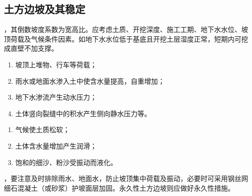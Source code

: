 \documentclass{book}
\begin{document}
\subsection{土方边坡及其稳定}
，其倒数坡度系数为宽高比。应考虑土质、开挖深度、施工工期、地下水水位、坡顶荷载及气候条件因素。如地下水水位低于基底且开挖土层湿度正常，短期内可挖成直壁不加支撑。
\begin{enumerate}
    \item 坡顶上堆物、行车等荷载；
    \item 雨水或地面水渗入土中使含水量提高，自重增加；
    \item 地下水渗流产生动水压力；
    \item 土体竖向裂缝中的积水产生侧向静水压力等。
\end{enumerate}
\begin{enumerate}
    \item 气候使土质松软；
    \item 土体含水量增加产生润滑；
    \item 饱和的细沙、粉沙受振动而液化。
\end{enumerate}
，要注意及时排除雨水、地面水，防止坡顶集中荷载及振动，必要时可采用钢丝网细石混凝土（或砂浆）护坡面层加固。永久性土方边坡则应做好永久性措施。
\end{document}
